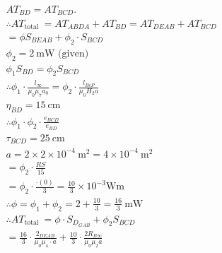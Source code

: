 \documentclass[12pt, a4paper]{article}
\begin{document}
$$
	\begin{aligned}
		 & A T_{B D}=A T_{B C D} .                                                                                                        \\
		 & \therefore A T_{\text {total }}=A T_{A B D A}+A T_{B D}=A T_{D E A B}+A T_{B C D}                                              \\
		 & =\phi S_{B E A B}+\phi_{2} \cdot S_{B C D}                                                                                     \\
		 & \phi_{2}=2 \mathrm{~mW} \text { (given) }                                                                                      \\
		 & \phi_{1} S_{B D}=\phi_{2} S_{B C D}                                                                                            \\
		 & \therefore \phi_{1} \cdot \frac{l_{\infty}}{\mu_{0} \mu_{7} a_{0}}=\phi_{2} \cdot \frac{l_{B c P}}{\mu_{0} H_{2} a}            \\
		 & \eta_{B D}=15 \mathrm{~cm}                                                                                                     \\
		 & \therefore \phi_{1} \cdot \phi_{2} \cdot \frac{e_{B C D}}{e_{B D}}                                                             \\
		 & \tau_{B C D}=25 \mathrm{~cm}                                                                                                   \\
		 & a=2 \times 2 \times 10^{-4} \mathrm{~m}^{2}=4 \times 10^{-4} \mathrm{~m}^{2}                                                   \\
		 & =\phi_{2} \cdot \frac{R S}{15}                                                                                                 \\
		 & =\phi_{2} \cdot \frac{\cdot(0)}{3}=\frac{10}{3} \times 10^{-3} \mathrm{Wm}                                                     \\
		 & \therefore \phi=\phi_{1}+\phi_{2}=2+\frac{10}{3}=\frac{16}{3} \mathrm{~mW}                                                     \\
		 & \therefore A T_{\text {total }}=\phi \cdot S_{D_{G A B}}+\phi_{2} S_{B C D}                                                    \\
		 & =\frac{16}{3} \cdot \frac{2{ }_{D E A B}}{\mu_{0} \mu_{4} \cdot a}+\frac{10}{3} \cdot \frac{2 R_{B \infty}}{\mu_{0} \mu_{2} a}
	\end{aligned}
$$
\end{document}
